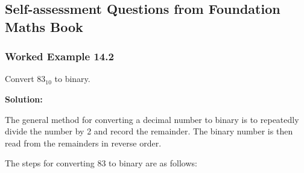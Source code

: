 \documentclass{article}
\begin{document}
\noindent{}

\newpage

\subsection*{Self-assessment Questions from Foundation Maths Book}
\subsubsection*{Worked Example 14.2} Convert $83_{10}$ to binary.

\vspace*{0.5cm}

\noindent \textbf{Solution:}

\vspace*{0.25cm}

\noindent The general method for converting a decimal number to binary is to repeatedly divide the number by 2 and record the remainder. 
The binary number is then read from the remainders in reverse order.

\vspace*{0.25cm}

\noindent The steps for converting 83 to binary are as follows:
\end{document}
